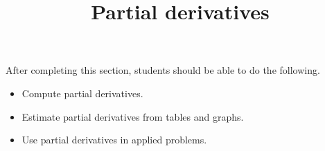 \documentclass{ximera}
\title{Partial derivatives}
\begin{document}
\begin{abstract}
\end{abstract}

\maketitle

\begin{sectionOutcomes}

After completing this section, students should be able to do the following.

\begin{itemize}
\item Compute partial derivatives.
\item Estimate partial derivatives from tables and graphs.
\item Use partial derivatives in applied problems. 
\end{itemize}

\end{sectionOutcomes}
\end{document}
